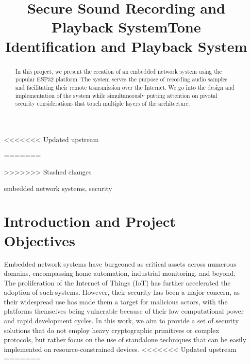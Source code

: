 \documentclass[conference]{IEEEtran}
\begin{document}
<<<<<<< Updated upstream
\title{Secure Sound Recording and Playback System}
=======
\title{Tone Identification and Playback System}
>>>>>>> Stashed changes

\author{
\and
{}
}

\maketitle

\begin{abstract}
    In this project, we present the creation of an
    embedded network system using the popular ESP32 platform. The system serves
    the purpose of recording audio samples and facilitating their remote
    transmission over the Internet. We go into the design and implementation
    of the system while simultaneously putting attention
    on pivotal security considerations that touch multiple
    layers of the architecture. 
\end{abstract}

\begin{IEEEkeywords}
embedded network systems, security
\end{IEEEkeywords}

\section{Introduction and Project Objectives}

Embedded network systems have burgeoned as critical assets across numerous
domains, encompassing home automation, industrial monitoring, and beyond. 
The proliferation of the Internet of Things (IoT) has further accelerated the
adoption of such systems\cite{IotTechEmbedded}.
However, their security has been a major concern,\cite{EmbeddedSecSurveyEU}
as their widespread use has made them a target for malicious actors, 
with the platforms themselves being vulnerable because of their low computational power and
rapid development cycles\cite{EmbeddedSecChallenges}.
In this work, we aim to provide a set of security solutions that do not employ 
heavy cryptographic primitives or complex protocols, but rather
focus on the use of standalone techniques that can be easily implemented
on resource-constrained devices.
<<<<<<< Updated upstream
=======
\end{document}
